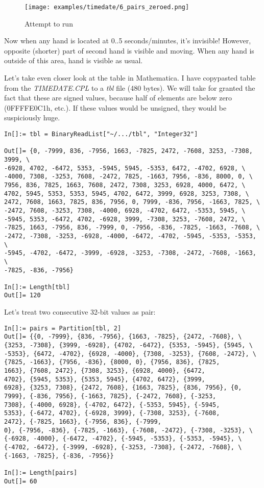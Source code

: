 \begin{figure}[H]
\centering
\texttt{[image: examples/timedate/6\_pairs\_zeroed.png]}
\caption{Attempt to run}
\end{figure}

Now when any hand is located at 0..5 seconds/minutes, it's invisible! However, opposite (shorter) part of second hand
is visible and moving.
When any hand is outside of this area, hand is visible as usual.

Let's take even closer look at the table in Mathematica.
I have copypasted table from the \emph{TIMEDATE.CPL} to a \emph{tbl} file (480 bytes).
We will take for granted the fact that these are signed values, because half of elements are below zero (0FFFFE0C1h, etc.).
If these values would be unsigned, they would be suspiciously huge.

\begin{lstlisting}[style=custommath]
In[]:= tbl = BinaryReadList["~/.../tbl", "Integer32"]

Out[]= {0, -7999, 836, -7956, 1663, -7825, 2472, -7608, 3253, -7308, 3999, \
-6928, 4702, -6472, 5353, -5945, 5945, -5353, 6472, -4702, 6928, \
-4000, 7308, -3253, 7608, -2472, 7825, -1663, 7956, -836, 8000, 0, \
7956, 836, 7825, 1663, 7608, 2472, 7308, 3253, 6928, 4000, 6472, \
4702, 5945, 5353, 5353, 5945, 4702, 6472, 3999, 6928, 3253, 7308, \
2472, 7608, 1663, 7825, 836, 7956, 0, 7999, -836, 7956, -1663, 7825, \
-2472, 7608, -3253, 7308, -4000, 6928, -4702, 6472, -5353, 5945, \
-5945, 5353, -6472, 4702, -6928, 3999, -7308, 3253, -7608, 2472, \
-7825, 1663, -7956, 836, -7999, 0, -7956, -836, -7825, -1663, -7608, \
-2472, -7308, -3253, -6928, -4000, -6472, -4702, -5945, -5353, -5353, \
-5945, -4702, -6472, -3999, -6928, -3253, -7308, -2472, -7608, -1663, \
-7825, -836, -7956}

In[]:= Length[tbl]
Out[]= 120
\end{lstlisting}

Let's treat two consecutive 32-bit values as pair:

\begin{lstlisting}[style=custommath]
In[]:= pairs = Partition[tbl, 2]
Out[]= {{0, -7999}, {836, -7956}, {1663, -7825}, {2472, -7608}, \
{3253, -7308}, {3999, -6928}, {4702, -6472}, {5353, -5945}, {5945, \
-5353}, {6472, -4702}, {6928, -4000}, {7308, -3253}, {7608, -2472}, \
{7825, -1663}, {7956, -836}, {8000, 0}, {7956, 836}, {7825, 
1663}, {7608, 2472}, {7308, 3253}, {6928, 4000}, {6472, 
4702}, {5945, 5353}, {5353, 5945}, {4702, 6472}, {3999, 
6928}, {3253, 7308}, {2472, 7608}, {1663, 7825}, {836, 7956}, {0, 
7999}, {-836, 7956}, {-1663, 7825}, {-2472, 7608}, {-3253, 
7308}, {-4000, 6928}, {-4702, 6472}, {-5353, 5945}, {-5945, 
5353}, {-6472, 4702}, {-6928, 3999}, {-7308, 3253}, {-7608, 
2472}, {-7825, 1663}, {-7956, 836}, {-7999, 
0}, {-7956, -836}, {-7825, -1663}, {-7608, -2472}, {-7308, -3253}, \
{-6928, -4000}, {-6472, -4702}, {-5945, -5353}, {-5353, -5945}, \
{-4702, -6472}, {-3999, -6928}, {-3253, -7308}, {-2472, -7608}, \
{-1663, -7825}, {-836, -7956}}

In[]:= Length[pairs]
Out[]= 60
\end{lstlisting}

